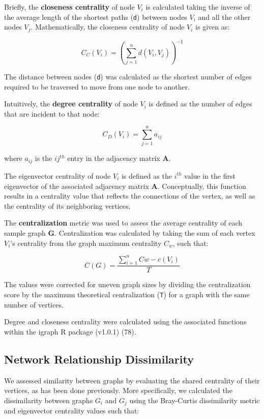 \documentclass[12pt,]{article}
\begin{document}
Briefly, the \textbf{closeness centrality} of node \(V_i\) is calculated
taking the inverse of the average length of the shortest paths
(\texttt{d}) between nodes \(V_i\) and all the other nodes \(V_j\).
Mathematically, the closeness centrality of node \(V_i\) is given as:

\[ { C }_{ C }\left( { V }_{ i } \right) ={ \left( \sum _{ j=1 }^{ n }{ d\left( { V }_{ i },{ V }_{ j } \right)  }  \right)  }^{ -1 } \]

The distance between nodes (\texttt{d}) was calculated as the shortest
number of edges required to be traversed to move from one node to
another.

Intuitively, the \textbf{degree centrality} of node \(V_i\) is defined
as the number of edges that are incident to that node:

\[ { C }_{ D }\left( { V }_{ i } \right) =\sum _{ j=1 }^{ n }{ { a }_{ ij } } \]

where \(a_{ij}\) is the \(ij^{th}\) entry in the adjacency matrix
\(\mathbf{A}\).

The eigenvector centrality of node \(V_i\) is defined as the \(i^{th}\)
value in the first eigenvector of the associated adjacency matrix
\(\mathbf{A}\). Conceptually, this function results in a centrality
value that reflects the connections of the vertex, as well as the
centrality of its neighboring vertices.

The \textbf{centralization} metric was used to assess the average
centrality of each sample graph \(\mathbf{G}\). Centralization was
calculated by taking the sum of each vertex \(V_{i}\)'s centrality from
the graph maximum centrality \(C_{w}\), such that:

\[ C\left( G \right) =\frac { \sum _{ i=1 }^{ n }{ Cw -c\left( { V }_{ i } \right)  }  }{ { T } }  \]

The values were corrected for uneven graph sizes by dividing the
centralization score by the maximum theoretical centralization
(\texttt{T}) for a graph with the same number of vertices.

Degree and closeness centrality were calculated using the associated
functions within the igraph R package (v1.0.1) (78).

\subsection{Network Relationship
Dissimilarity}\label{network-relationship-dissimilarity}

We assessed similarity between graphs by evaluating the shared
centrality of their vertices, as has been done previously. More
specifically, we calculated the dissimilarity between graphs \(G_{i}\)
and \(G_{j}\) using the Bray-Curtis dissimilarity metric and eigenvector
centrality values such that:
\end{document}
